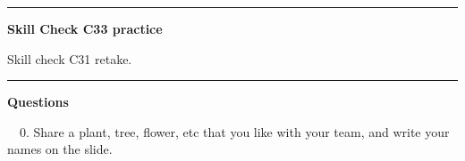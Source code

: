\documentclass[12pt,letterpaper,noanswers]{exam}
\begin{document}
\vspace{0.2cm}
\hrule
\vspace{0.2cm}

\noindent\textbf{Skill Check C33 practice}
\begin{questions}
\item Skill check C31 retake.

\end{questions}

\vspace{0.2cm}

\hrule
\vspace{0.2cm}


\noindent\textbf{Questions}

\noindent \ \ 0.  Share a plant, tree, flower, etc that you like with your team, and write your names on the slide.
\end{document}
